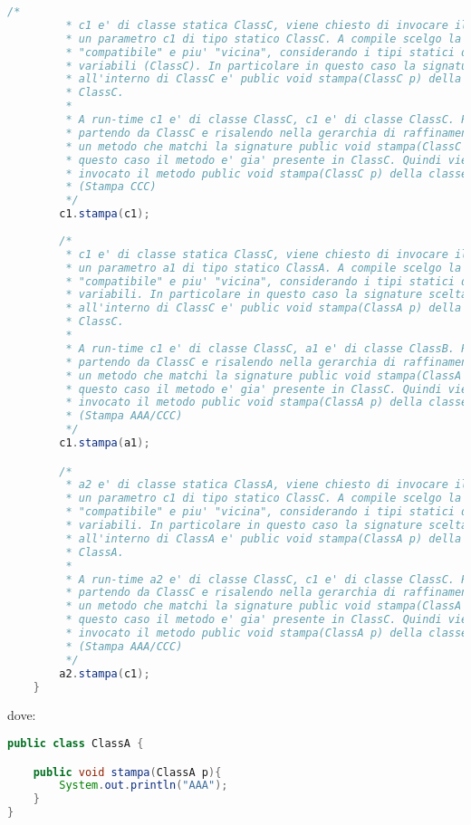 \documentclass{article}
\begin{document}
\begin{lstlisting}[language=Java,escapechar=|]
		/*
		 * c1 e' di classe statica ClassC, viene chiesto di invocare il metodo stampa su
		 * un parametro c1 di tipo statico ClassC. A compile scelgo la signature
		 * "compatibile" e piu' "vicina", considerando i tipi statici delle
		 * variabili (ClassC). In particolare in questo caso la signature scelta
		 * all'interno di ClassC e' public void stampa(ClassC p) della classe
		 * ClassC.
		 * 
		 * A run-time c1 e' di classe ClassC, c1 e' di classe ClassC. Per questo
		 * partendo da ClassC e risalendo nella gerarchia di raffinamento cerco
		 * un metodo che matchi la signature public void stampa(ClassC p). In
		 * questo caso il metodo e' gia' presente in ClassC. Quindi viene
		 * invocato il metodo public void stampa(ClassC p) della classe ClassC
		 * (Stampa CCC)
		 */
		c1.stampa(c1);
		
		/*
		 * c1 e' di classe statica ClassC, viene chiesto di invocare il metodo stampa su
		 * un parametro a1 di tipo statico ClassA. A compile scelgo la signature
		 * "compatibile" e piu' "vicina", considerando i tipi statici delle
		 * variabili. In particolare in questo caso la signature scelta
		 * all'interno di ClassC e' public void stampa(ClassA p) della classe
		 * ClassC.
		 * 
		 * A run-time c1 e' di classe ClassC, a1 e' di classe ClassB. Per questo
		 * partendo da ClassC e risalendo nella gerarchia di raffinamento cerco
		 * un metodo che matchi la signature public void stampa(ClassA p). In
		 * questo caso il metodo e' gia' presente in ClassC. Quindi viene
		 * invocato il metodo public void stampa(ClassA p) della classe ClassC
		 * (Stampa AAA/CCC)
		 */
		c1.stampa(a1);

		/*
		 * a2 e' di classe statica ClassA, viene chiesto di invocare il metodo stampa su
		 * un parametro c1 di tipo statico ClassC. A compile scelgo la signature
		 * "compatibile" e piu' "vicina", considerando i tipi statici delle
		 * variabili. In particolare in questo caso la signature scelta
		 * all'interno di ClassA e' public void stampa(ClassA p) della classe
		 * ClassA.
		 * 
		 * A run-time a2 e' di classe ClassC, c1 e' di classe ClassC. Per questo
		 * partendo da ClassC e risalendo nella gerarchia di raffinamento cerco
		 * un metodo che matchi la signature public void stampa(ClassA p). In
		 * questo caso il metodo e' gia' presente in ClassC. Quindi viene
		 * invocato il metodo public void stampa(ClassA p) della classe ClassC
		 * (Stampa AAA/CCC)
		 */
		a2.stampa(c1);
	}
\end{lstlisting}
dove: 
\begin{lstlisting}[language=Java,escapechar=|]
public class ClassA {

	public void stampa(ClassA p){
		System.out.println("AAA");
	}
}
\end{lstlisting}
\end{document}
